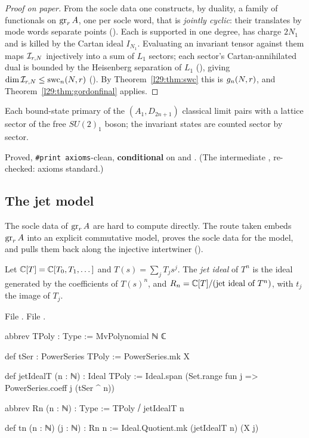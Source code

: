 \begin{proof}[Proof on paper]
From the socle data one constructs, by duality, a family of functionals on $\operatorname{gr}_rA$, one per socle word,
that is \emph{jointly cyclic}: their translates by mode words separate points (). Each is
supported in one degree, has charge $2N_1$ and is killed by the Cartan ideal $I_{N_1}$. Evaluating an invariant tensor
against them maps $\mathcal I_{r,N}$ injectively into a sum of $L_1$ sectors; each sector's Cartan-annihilated
dual is bounded by the Heisenberg separation of $L_1$ (), giving
$\dim\mathcal I_{r,N}\le\mathrm{swc}_n(N,r)$ (). By
Theorem~\ref{l29:thm:swc} this is $g_n(N,r)$, and Theorem~\ref{l29:thm:gordonfinal} applies.
\end{proof}

\begin{physics}
Each bound-state primary of the $(A_1,D_{2n+1})$ classical limit pairs with a lattice sector of the free $SU(2)_1$
boson; the invariant states are counted sector by sector.
\end{physics}

\begin{status}
Proved, \texttt{\#print axioms}-clean, \textbf{conditional} on  and . (The intermediate
, re-checked: axioms standard.)
\end{status}

\subsection{The jet model}

The socle data of $\operatorname{gr}_rA$ are hard to compute directly. The route taken embeds $\operatorname{gr}_rA$ into an
explicit commutative model, proves the socle data for the model, and pulls them back along the injective intertwiner
().

\begin{definition}\label{l29:def:Rn}
Let ${\mathbb{C}}[T]={\mathbb{C}}[T_0,T_1,\dots]$ and $T(s)=\sum_jT_js^j$. The \emph{jet ideal} of $T^n$ is the ideal generated by the
coefficients of $T(s)^n$, and $R_n={\mathbb{C}}[T]/(\text{jet ideal of }T^n)$, with $t_j$ the image of $T_j$.
\end{definition}

\noindent File .
\noindent File .
\begin{leancode}
abbrev TPoly : Type := MvPolynomial ℕ ℂ

def tSer : PowerSeries TPoly := PowerSeries.mk X

def jetIdealT (n : ℕ) : Ideal TPoly :=
  Ideal.span (Set.range fun j => PowerSeries.coeff j (tSer ^ n))

abbrev Rn (n : ℕ) : Type := TPoly ⧸ jetIdealT n

def tn (n : ℕ) (j : ℕ) : Rn n := Ideal.Quotient.mk (jetIdealT n) (X j)
\end{leancode}

